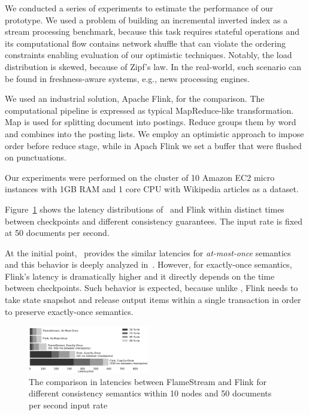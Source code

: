 \label {fs-short-experiments}

We conducted a series of experiments to estimate the performance of our prototype. We used a problem of building an incremental inverted index as a stream processing benchmark, because this task requires stateful operations and its computational flow contains network shuffle that can violate the ordering constraints enabling evaluation of our optimistic techniques. Notably, the load distribution is skewed, because of Zipf's law. In the real-world, such scenario can be found in freshness-aware systems, e.g., news processing engines.

We used an industrial solution, Apache Flink, for the comparison. The computational pipeline is expressed as typical MapReduce-like transformation. Map is used for splitting document into postings. Reduce groups them by word and combines into the posting lists. We employ an optimistic approach to impose order before reduce stage, while in Apach Flink we set a buffer that were flushed on punctuations.

Our experiments were performed on the cluster of 10 Amazon EC2 micro instances with 1GB RAM and 1 core CPU with Wikipedia articles as a dataset.

Figure~\ref{performance} shows the latency distributions of \FlameStream\ and Flink within distinct times between checkpoints and different consistency guarantees. The input rate is fixed at 50 documents per second.

At the initial point, \FlameStream\ provides the similar latencies for {\em at-most-once} semantics and this behavior is deeply analyzed in~\cite{we2018seim}. However, for exactly-once semantics, Flink's latency is dramatically higher and it directly depends on the time between checkpoints. Such behavior is expected, because unlike \FlameStream, Flink needs to take state snapshot and release output items within a single transaction in order to preserve exactly-once semantics.

\begin{figure}[htbp]
  \centering
  \includegraphics[width=0.47\textwidth]{pics/comparison}
  \caption{The comparison in latencies between FlameStream and Flink for different consistency semantics within 10 nodes and 50 documents per second input rate}
  \label {performance}
\end{figure}
